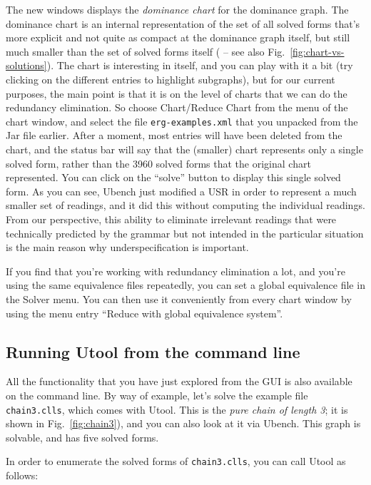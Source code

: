 The new windows displays the \emph{dominance chart} for the dominance graph. The dominance chart is an internal representation of the set of all solved forms that's more explicit and not quite as compact at the dominance graph itself, but still much smaller than the set of solved forms itself ( -- see also Fig.~\ref{fig:chart-vs-solutions}). The chart is interesting in itself, and you can play with it a bit (try clicking on the different entries to highlight subgraphs), but for our current purposes, the main point is that it is on the level of charts that we can do the redundancy elimination. So choose Chart/Reduce Chart from the menu of the chart window, and select the file \verb?erg-examples.xml? that you unpacked from the Jar file earlier. After a moment, most entries will have been deleted from the chart, and the status bar will say that the (smaller) chart represents only a single solved form, rather than the 3960 solved forms that the original chart represented. You can click on the ``solve'' button to display this single solved form. As you can see, Ubench just modified a USR in order to represent a much smaller set of readings, and it did this without computing the individual readings. From our perspective, this ability to eliminate irrelevant readings that were technically predicted by the grammar but not intended in the particular situation is the main reason why underspecification is important.

If you find that you're working with redundancy elimination a lot, and you're using the same equivalence files repeatedly, you can set a global equivalence file in the Solver menu. You can then use it conveniently from every chart window by using the menu entry ``Reduce with global equivalence system''.


\subsection{Running Utool from the command line}

All the functionality that you have just explored from the GUI is also available on the command line. By way of example, let's solve the example file \verb?chain3.clls?, which comes with Utool. This is the \emph{pure chain of length 3}; it is shown in Fig.~\ref{fig:chain3}), and you can also look at it via Ubench. This graph is solvable, and has five solved forms.

In order to enumerate the solved forms of \verb?chain3.clls?, you can call Utool as follows:

